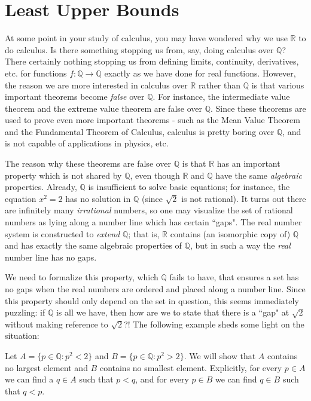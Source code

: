 \documentclass[12pt,letterpaper,reqno]{article}
\numberwithin{equation}{section}
\newcommand{\R}{\ensuremath{\mathbb R}}
\newcommand{\Q}{\ensuremath{\mathbb Q}}
\newcommand{\fixme}[1]{{\color{orange}{[#1]}}}
\begin{document}
{\section{Least Upper Bounds}
At some point in your study of calculus, you may have wondered why we use $\R$ to do calculus. Is there something stopping us from, say, doing calculus over $\Q$? There certainly nothing stopping us from defining limits, continuity, derivatives, etc. for functions $f:\Q \to \Q$ exactly as we have done for real functions. \fixme{Add example.} However, the reason we are more interested in calculus over $\R$ rather than $\Q$ is that various important theorems become \emph{false} over $\Q$. For instance, the intermediate value theorem and the extreme value theorem are false over $\Q$. \fixme{Add examples.} Since these theorems are used to prove even more important theorems - such as the Mean Value Theorem and the Fundamental Theorem of Calculus, calculus is pretty boring over $\Q$, and is not capable of applications in physics, etc.

The reason why these theorems are false over $\Q$ is that $\R$ has an important property which is not shared by $\Q$, even though $\R$ and $\Q$ have the same \emph{algebraic} properties. Already, $\Q$ is insufficient to solve basic equations; for instance, the equation $x^2=2$ has no solution in $\Q$ (since $\sqrt{2}$ is not rational). It turns out there are infinitely many \emph{irrational} numbers, so one may visualize the set of rational numbers as lying along a number line which has certain ``gaps". The real number system is constructed to \emph{extend} $\Q$; that is, $\R$ contains (an isomorphic copy of) $\Q$ and has exactly the same algebraic properties of $\Q$, but in such a way the \emph{real} number line has no gaps. 

We need to formalize this property, which $\Q$ fails to have, that ensures a set has no gaps when the real numbers are ordered and placed along a number line. Since this property should only depend on the set in question, this seems immediately puzzling: if $\Q$ is all we have, then how are we to state that there is a ``gap" at $\sqrt{2}$ without making reference to $\sqrt{2}$?! The following example sheds some light on the situation:
\begin{example}\label{ex:q_no_lub_property}
Let $A=\{p \in \Q: p^2<2\}$ and $B=\{p \in \Q:p^2>2\}$. We will show that $A$ contains no largest element and $B$ contains no smallest element. Explicitly, for every $p \in A$ we can find a $q \in A$ such that $p<q$, and for every $p\in B$ we can find $q \in B$ such that $q<p$.


\end{example}}
\end{document}
